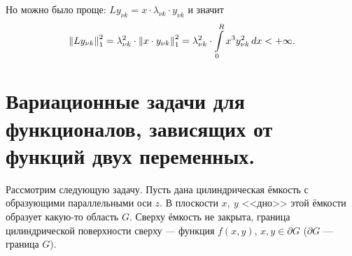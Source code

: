 Но можно было проще: $Ly_{\nu k}=x\cdot\lambda_{\nu k}\cdot y_{\nu k}$ и значит
\begin{equation*}
	\left\|Ly_{\nu k}\right\|_1^2=\lambda_{\nu k}^2\cdot\left\|x\cdot y_{\nu k}\right\|_1^2=\lambda_{\nu k}^2\cdot\int\limits_0^R x^3 y_{\nu k}^2\,dx<+\infty.
\end{equation*} 
\section[Функционалы, зависящие от функций двух переменных.]{Вариационные задачи для функционалов, зависящих от функций двух переменных.}
\label{lecture9section2}
Рассмотрим следующую задачу. Пусть дана цилиндрическая ёмкость с образующими параллельными оси $z$. В плоскости $x,\ y$ <<дно>> этой ёмкости образует какую-то область $G$. Сверху ёмкость не закрыта, граница цилиндрической поверхности сверху --- функция $f(x,y)$, $x,y\in\partial G$ ($\partial G$ --- граница $G$).


